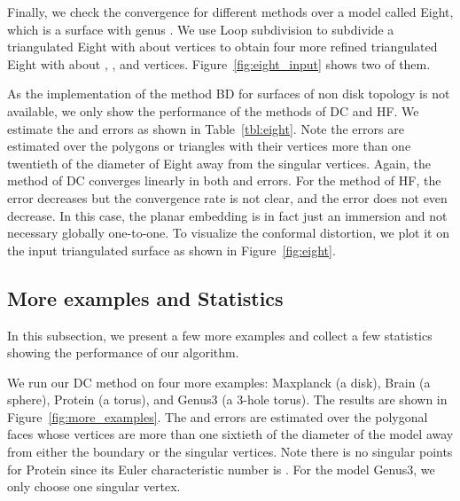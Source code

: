 \documentclass[11pt]{article}
\begin{document}
\vspace{0.1in}
Finally, we check the convergence for different methods over a model called Eight, which is a 
surface with genus . We use Loop subdivision to subdivide a triangulated Eight with about  
vertices to obtain four more refined triangulated Eight with about , ,  and  vertices. 
Figure~\ref{fig:eight_input} shows two of them. 

As the implementation of the method BD for surfaces of non disk topology is not available, we only 
show the performance of the methods of DC and HF. 
We estimate the  and  errors as shown in Table~\ref{tbl:eight}. Note the errors are
estimated over the polygons or triangles with their vertices more than one twentieth of the diameter
of Eight away from the singular vertices. 
Again, the method of DC converges linearly in both  and  errors. 
For the method of HF, the  error decreases but the convergence rate is not clear, 
and the  error does not even decrease. 
In this case, the planar embedding is in fact just an immersion and not necessary globally one-to-one. 
To visualize the conformal distortion, we plot it on the input triangulated surface as shown in Figure~\ref{fig:eight}.



\subsection{More examples and Statistics}
In this subsection, we present a few more examples and collect a few statistics
showing the performance of our algorithm. 

We run our DC method on four more examples: Maxplanck (a disk), 
Brain (a sphere), Protein (a torus), and Genus3 (a 3-hole torus). 
The results are shown in Figure~\ref{fig:more_examples}.  
The  and   errors are estimated over the polygonal faces
whose vertices are more than one sixtieth of the diameter of the 
model away from either the boundary or the singular vertices.
Note there is no singular points for Protein since its Euler characteristic
number is . For the model Genus3, we only choose one singular vertex.
\end{document}

